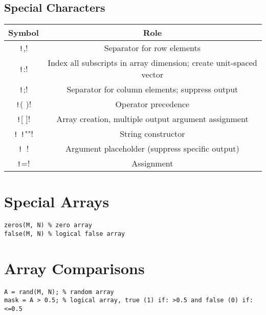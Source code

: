 \documentclass{article}
\begin{document}
\subsection*{Special Characters}
\begin{table}[H]
    \centering
    \begin{tabular}{c c}
        \toprule
        \textbf{Symbol}          & \textbf{Role}                                                      \\
        \midrule
        \texttt!,!   & Separator for row elements                                         \\
        \texttt!:!   & Index all subscripts in array dimension; create unit-spaced vector \\
        \texttt!;!   & Separator for column elements; suppress output                     \\
        \texttt!( )! & Operator precedence                                                \\
        \texttt![ ]! & Array creation, multiple output argument assignment                \\
        \texttt!%
        \texttt!""!  & String constructor                                                 \\
        \texttt!~!   & Argument placeholder (suppress specific output)                    \\
        \texttt!=!   & Assignment                                                         \\
        \bottomrule
    \end{tabular}
\end{table}
\section*{Special Arrays}
\begin{verbatim}
zeros(M, N) % zero array
false(M, N) % logical false array
\end{verbatim}
\section*{Array Comparisons}
\begin{verbatim}
A = rand(M, N); % random array
mask = A > 0.5; % logical array, true (1) if: >0.5 and false (0) if: <=0.5
\end{verbatim}
\end{document}
